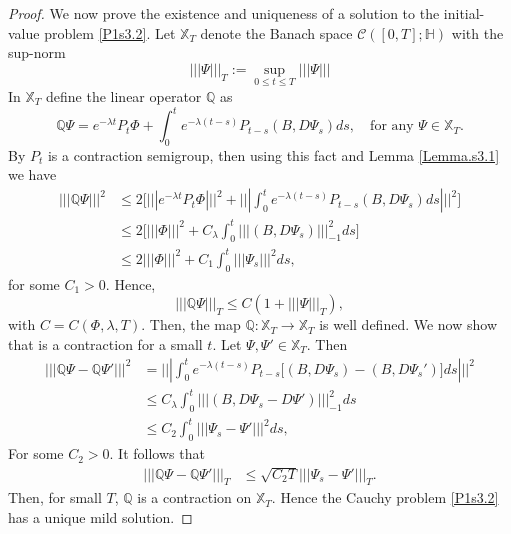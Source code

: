 \documentclass[review, onefignum, onetabnum]{siamart171218}
\begin{document}
\begin{proof}
We now prove the existence and uniqueness of a solution to the initial- value 
problem \eqref{P1s3.2}. Let $\mathbb{X}_T$ denote the
Banach space $\mathcal{C}([0,T];\mathbb{H})$ with the sup-norm 
 \begin{equation*}
  |||\Psi |||_T := \sup_{0\le t\le T} |||\Psi |||
 \end{equation*}
In $\mathbb{X}_T$ define the linear operator $\mathbb{Q}$ as
\begin{equation*}
 \mathbb{Q}\Psi= e^{-\lambda t}P_t\Phi + \int_0^t e^{-\lambda 
(t-s)}P_{t-s}(B,D\Psi_s) ds,\quad\mbox{for any } \Psi\in\mathbb{X}_T. 
\end{equation*}
By  $P_t$ is a contraction semigroup, then using this 
fact and Lemma \ref{Lemma.s3.1} we have
\begin{align*}
 ||| \mathbb{Q}\Psi|||^2 &\le 2\Bigg[ ||| e^{-\lambda t}P_t\Phi|||^2 + 
|||\int_0^t e^{-\lambda (t-s)}P_{t-s}(B,D\Psi_s) ds |||^2\Bigg]\\
 &\le 2\Big[ |||\Phi|||^2 + C_\lambda \int_0^t |||(B,D\Psi_s) |||_{-1}^2 ds 
\Big] \\
 &\le 2 |||\Phi|||^2 + C_1 \int_0^t |||\Psi_s|||^2 ds, 
\end{align*}
for some $C_1>0$. Hence, 
\[
 ||| \mathbb{Q}\Psi|||_T \le C(1+||| \Psi|||_T), 
\]
with $C=C(\Phi,\lambda, T)$. Then, the map $\mathbb{Q}:\mathbb{X}_T 
\rightarrow \mathbb{X}_T$ is well defined. We now show that is a contraction 
for a 
small $t$. Let $\Psi,\Psi'\in \mathbb{X}_T$. Then
\begin{align*}
 ||| \mathbb{Q}\Psi- \mathbb{Q}\Psi'|||^2 &=  |||\int_0^t e^{-\lambda 
(t-s)}P_{t-s}\big[(B,D\Psi_s)-(B,D\Psi_s')\big] ds |||^2\\
 &\le  C_\lambda \int_0^t |||(B,D\Psi_s-D\Psi') |||_{-1}^2 ds \\
 &\le  C_2 \int_0^t |||\Psi_s-\Psi'|||^2 ds,  
\end{align*}
For some $C_2>0$. It follows that 
\begin{align*}
 ||| \mathbb{Q}\Psi- \mathbb{Q}\Psi'|||_T  &\le  \sqrt{C_2 T} 
|||\Psi_s-\Psi'|||_T.  
\end{align*}
Then, for small $T$, $\mathbb{Q}$ is a contraction on $\mathbb{X}_T$. Hence 
the Cauchy problem \eqref{P1s3.2} has a unique mild solution. 
 
\end{proof}
\end{document}
